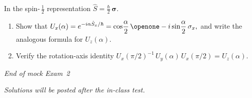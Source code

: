 \documentclass[12pt]{article}
\newcommand{\vv}{\medskip}
\begin{document}
In the spin‑\,$\tfrac12$ representation $\hat S = \frac{\hbar}{2}\,\boldsymbol\sigma$.

\begin{enumerate}[label=\textbf{\alph*)}, leftmargin=1.2cm]
  \item  Show that
        $\displaystyle
          U_x(\alpha)=e^{-i\alpha\hat S_x/\hbar}
          =\cos\!\frac{\alpha}{2}\,\openone
          -i\sin\!\frac{\alpha}{2}\,\sigma_x,
        $
        and write the analogous formula for $U_z(\alpha)$.\vv
  \item  Verify the rotation‑axis identity
        $
          U_x(\pi/2)^{-1}\,U_y(\alpha)\,U_x(\pi/2)=U_z(\alpha).
        $
\end{enumerate}

\newpage
\begin{center}
  {\large\slshape End of mock Exam 2}\bigskip

  \emph{Solutions will be posted after the in‑class test.}
\end{center}
\end{document}
